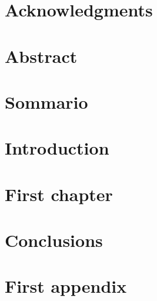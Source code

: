 \documentclass[11pt,oneside,english]{book}
\begin{document}
\frontmatter
\pagestyle{empty}
\restoregeometry

\clearpage{}

\begin{flushright}
\emph{}\clearpage{}
\par\end{flushright}


\chapter*{Acknowledgments}

\thispagestyle{empty}\clearpage{}


\chapter*{Abstract}

\thispagestyle{empty}\clearpage{}


\chapter*{Sommario}

\thispagestyle{empty}\clearpage{}
\setcounter{page}{1}
\pagestyle{fancy}\tableofcontents{}\listoffigures
\listoftables
{}
\clearpage{}\mainmatter
\renewcommand{\sectionmark}[1]{\markright{\thesection.\ #1}}
\renewcommand{\chaptermark}[1]{\markboth{\thechapter.\ #1}{}}


\chapter*{Introduction\label{chap:introduction}}



\chapter{First chapter\label{chap:first-chapter}}




\chapter*{Conclusions\label{chap:conclusion}}




\appendix

\chapter{First appendix\label{app:first-appendix}}



\clearpage{}
\end{document}
